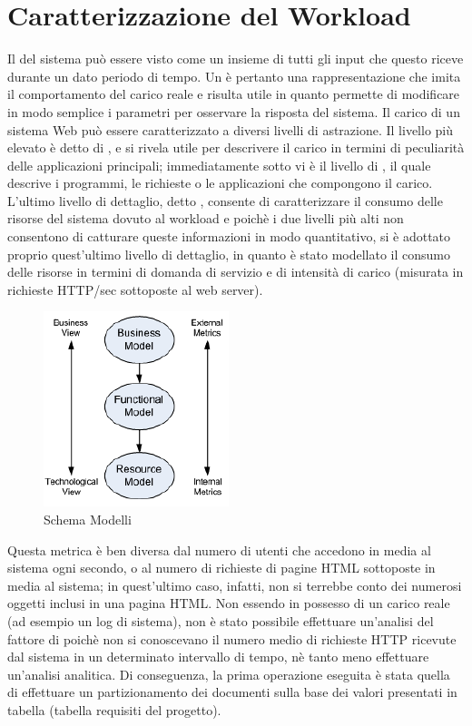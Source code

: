 \chapter{Caratterizzazione del Workload}
Il  del sistema può essere visto come un insieme di tutti gli input che questo riceve durante un dato periodo di tempo. Un  è pertanto una rappresentazione che imita il comportamento del carico reale e risulta utile in quanto permette di modificare in modo semplice i parametri per osservare la risposta del sistema. Il carico di un sistema Web può essere caratterizzato a diversi livelli di astrazione. Il livello più elevato è detto di , e si rivela utile per descrivere il carico in termini di peculiarità delle applicazioni principali; immediatamente sotto vi è il livello di , il quale descrive i programmi, le richieste o le applicazioni che compongono il carico. L'ultimo livello di dettaglio, detto , consente di caratterizzare il consumo delle risorse del sistema dovuto al workload e poichè i due livelli più alti non consentono di catturare queste informazioni in modo quantitativo, si è adottato proprio quest'ultimo livello di dettaglio, in quanto è stato modellato il consumo delle risorse in termini di domanda di servizio e di intensità di carico (misurata in richieste HTTP/sec sottoposte al web server). 
\begin{figure}[H]
\begin{center}
\includegraphics[scale=1.2]{etc/schema3.png}
\caption{Schema Modelli}
\label{schema3}
\end{center}
\end{figure}
Questa metrica è ben diversa dal numero di utenti che accedono in media al sistema ogni secondo, o al numero di richieste di pagine HTML sottoposte in media al sistema; in quest'ultimo caso, infatti, non si terrebbe conto dei numerosi oggetti inclusi in una pagina HTML. 
Non essendo in possesso di un carico reale (ad esempio un log di sistema), non è stato possibile effettuare un'analisi del fattore di  poichè non si conoscevano il numero medio di richieste HTTP ricevute dal sistema in un determinato intervallo di tempo, nè tanto meno effettuare un'analisi analitica. Di conseguenza, la prima operazione eseguita è stata quella di effettuare un partizionamento dei documenti sulla base dei valori presentati in tabella (tabella requisiti del progetto). 
